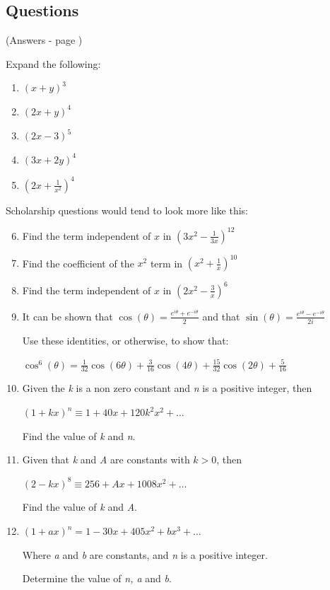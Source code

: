 \documentclass[../main.tex]{subfiles}
\begin{document}
\pagebreak

\subsection*{Questions}
(Answers - page {\pageref*{Binomial expansion answers}})
\label{Binomial Expansion}

Expand the following:

\begin{enumerate}
    \item \( (x+y)^3 \)
    \item \( (2x+y)^4 \)
    \item \( (2x-3)^5 \)
    \item \( (3x+2y)^4 \)
    \item \( (2x + \frac{1}{x^2 } )^4 \)
\end{enumerate}

Scholarship questions would tend to look more like this:

\begin{enumerate}
    \setcounter{enumi}{5}
    \item Find the term independent of \( x \) in \( (3x^2 - \frac{1}{3x})^{12}  \)
    \item Find the coefficient of the \( x^2 \) term in \( (x^2 + \frac{1}{x})^{10} \)
    \item Find the term independent of \( x \) in \( (2x^2 - \frac{3}{x})^6 \)
    \item It can be shown that \( \cos(\theta) = \frac{e^{i\theta}+e^{-i\theta}}{2}\) and that \( \sin(\theta) = \frac{e^{i\theta}-e^{-i\theta}}{2i}\)
   
    Use these identities, or otherwise, to show that:

    \( \cos^6(\theta) = \frac{1}{32}\cos(6\theta) + \frac{3}{16}\cos(4\theta)+\frac{15}{32}\cos(2\theta)+\frac{5}{16}\)

    \item Given the \textit{k} is a non zero constant and \textit{n} is a positive integer, then
    
    \( (1+kx)^n \equiv 1+40x+120k^2x^2+\dots\)

    Find the value of \textit{k} and \textit{n}.

    \item Given that \textit{k} and \textit{A} are constants with \(k>0\), then
    
    \( (2-kx)^8 \equiv 256+Ax+1008x^2+\dots\)

    Find the value of \textit{k} and \textit{A}.

    \item \( (1+ax)^n = 1-30x+405x^2+bx^3+\dots \)
    
    Where \textit{a} and \textit{b} are constants, and \textit{n} is a positive integer.

    Determine the value of \textit{n, a} and \textit{b}.
\end{enumerate}
\end{document}
